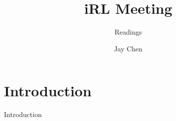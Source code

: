 \documentclass[slides]{beamer}
\title{iRL Meeting}
\subtitle{Readings}
\author{Jay Chen}
\begin{document}
	\begin{frame}
	    \titlepage
	\end{frame}


\section{Introduction}
\begin{frame}{Introduction}
\end{frame}
\end{document}
